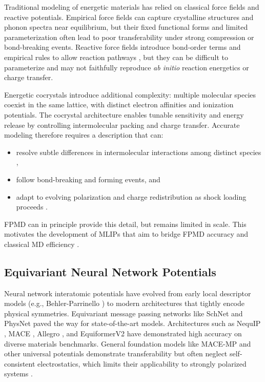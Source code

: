 \documentclass{article}
\begin{document}
Traditional modeling of energetic materials has relied on classical force fields and reactive potentials. Empirical force fields can capture crystalline structures and phonon spectra near equilibrium, but their fixed functional forms and limited parameterization often lead to poor transferability under strong compression or bond-breaking events. Reactive force fields introduce bond-order terms and empirical rules to allow reaction pathways \cite{van2001reaxff}, but they can be difficult to parameterize and may not faithfully reproduce \emph{ab initio} reaction energetics or charge transfer.

Energetic cocrystals introduce additional complexity: multiple molecular species coexist in the same lattice, with distinct electron affinities and ionization potentials. The cocrystal architecture enables tunable sensitivity and energy release by controlling intermolecular packing and charge transfer. Accurate modeling therefore requires a description that can:
\begin{itemize}
    \item resolve subtle differences in intermolecular interactions among distinct species \cite{iosipescu2001experimental},
    \item follow bond-breaking and forming events, and
    \item adapt to evolving polarization and charge redistribution as shock loading proceeds \cite{valeeswaran2023charge}.
\end{itemize}
FPMD can in principle provide this detail, but remains limited in scale. This motivates the development of MLIPs that aim to bridge FPMD accuracy and classical MD efficiency \cite{unke2021machine,goedecker2023perspective}.

\subsection{Equivariant Neural Network Potentials}

Neural network interatomic potentials have evolved from early local descriptor models (e.g., Behler-Parrinello \cite{behler2007generalized}) to modern architectures that tightly encode physical symmetries. Equivariant message passing networks like SchNet \cite{schutt2017schnet} and PhysNet \cite{unke2019physnet} paved the way for state-of-the-art models. Architectures such as NequIP \cite{batzner20223}, MACE \cite{batatia2022mace,kovacs2023mace}, Allegro \cite{musaelian2023learning}, and EquiformerV2 \cite{liao2023equiformer} have demonstrated high accuracy on diverse materials benchmarks. General foundation models like MACE-MP \cite{batatia2023foundation} and other universal potentials \cite{chen2024universal} demonstrate transferability but often neglect self-consistent electrostatics, which limits their applicability to strongly polarized systems \cite{musil2021physics,fu2023forces}.
\end{document}
